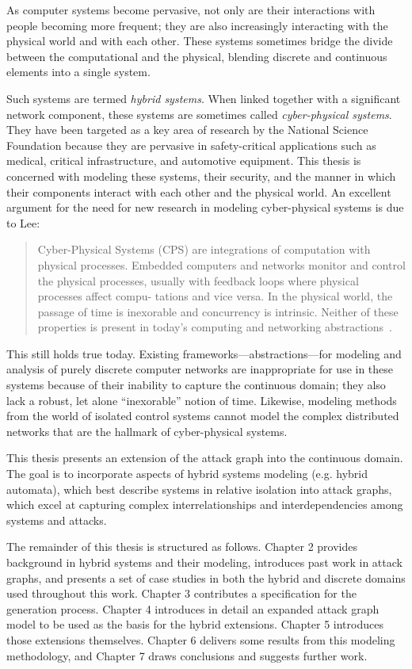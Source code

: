 As computer systems become pervasive, not only are 
their interactions with people becoming more frequent; they are also
increasingly interacting with the physical world and with each other. These
systems sometimes bridge the divide between the computational and the physical,
blending discrete and continuous elements into a single system.

Such systems are termed \emph{hybrid systems}. When linked together with a 
significant network component, these systems are sometimes called
\emph{cyber-physical systems}. They have been targeted as a key area of 
research by the National Science Foundation because they are pervasive in 
safety-critical applications such as medical, critical infrastructure, and
automotive equipment. This thesis is concerned with modeling
these systems, their security, and the manner in which their components
interact with each other and the physical world.
An excellent argument for the need for new research in modeling cyber-physical 
systems is due to Lee:
\begin{quote}
Cyber-Physical Systems (CPS) are integrations of computation with physical
processes. Embedded computers and networks monitor and control the physical
processes, usually with feedback loops where physical processes affect compu-
tations and vice versa. In the physical world, the passage of time is inexorable
and concurrency is intrinsic. Neither of these properties is present in today's
computing and networking abstractions~\cite{lee2006cyber}.
\end{quote}

This still holds true today. Existing frameworks---abstractions---for modeling 
and analysis of purely discrete computer networks are inappropriate for use in
these systems because of their inability to capture the continuous domain; they
also lack a robust, let alone ``inexorable'' notion of time. Likewise, 
modeling methods from the world of isolated control systems cannot model the
complex distributed networks that are the hallmark of cyber-physical systems.

This thesis presents an extension of the attack graph into the 
continuous domain. 
The goal is to incorporate aspects of hybrid systems
modeling (e.g. hybrid automata), which best describe systems in 
relative isolation into attack graphs, which excel at capturing complex 
interrelationships and interdependencies among systems and attacks.

The remainder of this thesis is structured as follows. Chapter 2 provides 
background in hybrid systems and their modeling, introduces past work in attack 
graphs, and presents a set of case studies in both the hybrid and discrete 
domains used throughout this work. Chapter 3 contributes a specification for 
the generation process. Chapter 4 introduces in detail an expanded attack graph 
model to be used as the basis for the hybrid extensions. Chapter 5
introduces those extensions themselves. Chapter 6 delivers some results from 
this modeling methodology, and Chapter 7 draws conclusions and suggests 
further work.